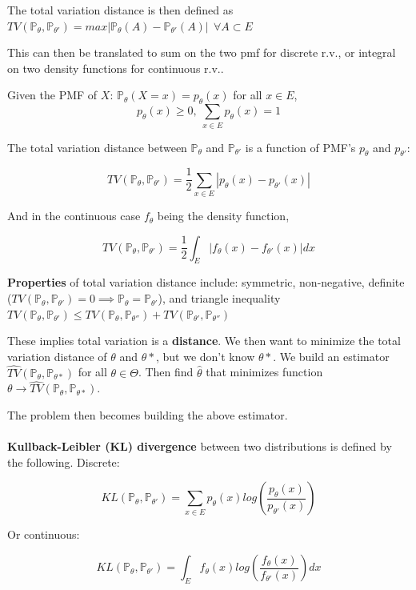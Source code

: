 \documentclass{article}
\begin{document}
The total variation distance is then defined as $TV(\mathbb{P}_{\theta}, \mathbb{P}_{\theta'}) = max| \mathbb{P}_{\theta}(A) - \mathbb{P}_{\theta'}(A) | ~ ~ \forall A \subset E$

This can then be translated to sum on the two pmf for discrete r.v., or integral on two density functions for continuous r.v..

Given the PMF of $X$: $\mathbb{P}_{\theta} (X = x) = p_{\theta}(x)$ for all $x \in E$,
$$
p_{\theta}(x) \geq 0, ~ \sum_{x \in E} p_{\theta}(x) = 1
$$

The total variation distance between $\mathbb{P}_{\theta}$ and $\mathbb{P}_{\theta'}$ is a function of PMF's $p_{\theta}$ and $p_{\theta'}$:

$$
TV(\mathbb{P}_{\theta}, \mathbb{P}_{\theta'}) = \frac{1}{2} \sum_{x \in E} |p_{\theta}(x) - p_{\theta'}(x)|
$$

And in the continuous case $f_{\theta}$ being the density function,

$$
TV(\mathbb{P}_{\theta}, \mathbb{P}_{\theta'}) = \frac{1}{2} \int_{E} |f_{\theta}(x) - f_{\theta'}(x)| dx
$$

\textbf{Properties} of total variation distance include:
symmetric,
non-negative,
definite ($TV(\mathbb{P}_{\theta}, \mathbb{P}_{\theta'}) = 0 \implies \mathbb{P}_{\theta} = \mathbb{P}_{\theta'}$), and
triangle inequality $TV(\mathbb{P}_{\theta}, \mathbb{P}_{\theta'}) \leq TV(\mathbb{P}_{\theta}, \mathbb{P}_{\theta''}) + TV(\mathbb{P}_{\theta'}, \mathbb{P}_{\theta''})$

These implies total variation is a \textbf{distance}.
We then want to minimize the total variation distance of $\theta$ and $\theta*$, but we don't know $\theta*$.
We build an estimator $\hat{TV}(\mathbb{P}_{\theta}, \mathbb{P}_{\theta*})$ for all $\theta \in \Theta$.
Then find $\hat{\theta}$ that minimizes function $\theta \to \hat{TV}(\mathbb{P}_{\theta}, \mathbb{P}_{\theta*})$.

The problem then becomes building the above estimator.
\\
\\
\textbf{Kullback-Leibler (KL) divergence} between two distributions is defined by the following.
Discrete:

$$
KL(\mathbb{P}_{\theta}, \mathbb{P}_{\theta'}) = \sum_{x \in E} p_{\theta}(x) log(\frac{p_{\theta}(x)}{p_{\theta'}(x)})
$$

Or continuous:

$$
KL(\mathbb{P}_{\theta}, \mathbb{P}_{\theta'}) = \int_E f_{\theta}(x) log(\frac{f_{\theta}(x)}{f_{\theta'}(x)}) dx
$$
\end{document}
